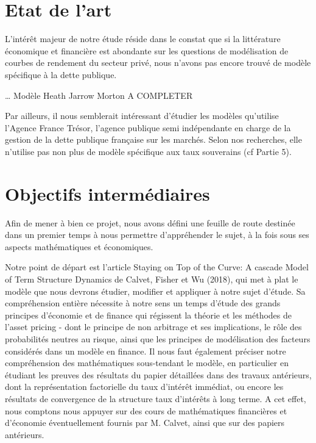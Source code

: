 \documentclass[a4paper]{article}
\begin{document}
\section{Etat de l’art}


L’intérêt majeur de notre étude réside dans le constat que si la littérature économique et financière est abondante sur les questions de modélisation de courbes de rendement du secteur privé, nous n’avons pas encore trouvé de modèle spécifique à la dette publique. 

… Modèle Heath Jarrow Morton A COMPLETER

Par ailleurs, il nous semblerait intéressant d’étudier les modèles qu’utilise l’Agence France Trésor, l’agence publique semi indépendante en charge de la gestion de la dette publique française sur les marchés. Selon nos recherches, elle n’utilise pas non plus de modèle spécifique aux taux souverains (cf Partie 5).




\section{Objectifs intermédiaires}



Afin de mener à bien ce projet, nous avons défini une feuille de route destinée dans un premier temps à nous permettre d’appréhender le sujet, à la fois sous ses aspects mathématiques et économiques. 

Notre point de départ est l’article Staying on Top of the Curve: A cascade Model of Term Structure Dynamics de Calvet, Fisher et Wu (2018), qui met à plat le modèle que nous devrons étudier, modifier et appliquer à notre sujet d’étude. Sa compréhension entière nécessite à notre sens un temps d’étude des grands principes d’économie et de finance qui régissent la théorie et les méthodes de l’asset pricing - dont le principe de non arbitrage et ses implications, le rôle des probabilités neutres au risque, ainsi que les principes de modélisation des facteurs considérés dans un modèle en finance. Il nous faut également préciser notre compréhension des mathématiques sous-tendant le modèle, en particulier en étudiant les preuves des résultats du papier détaillées dans des travaux antérieurs, dont la représentation factorielle du taux d’intérêt immédiat, ou encore les résultats de convergence de la structure taux d’intérêts à long terme. A cet effet, nous comptons nous appuyer sur des cours de mathématiques financières et d’économie éventuellement fournis par M. Calvet, ainsi que sur des papiers antérieurs.
\end{document}
